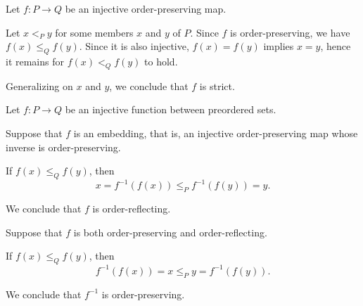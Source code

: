 \begin{defproof}
   Let \( f: P \to Q \) be an injective order-preserving map.

  Let \( x <_P y \) for some members \( x \) and \( y \) of \( P \). Since \( f \) is order-preserving, we have \( f(x) \leq_Q f(y) \). Since it is also injective, \( f(x) = f(y) \) implies \( x = y \), hence it remains for \( f(x) <_Q f(y) \) to hold.

  Generalizing on \( x \) and \( y \), we conclude that \( f \) is strict.

   Let \( f: P \to Q \) be an injective function between preordered sets.

  \SufficiencySubProof* Suppose that \( f \) is an embedding, that is, an injective order-preserving map whose inverse is order-preserving.

  If \( f(x) \leq_Q f(y) \), then
  \begin{equation*}
    x = f^{-1}(f(x)) \leq_P f^{-1}(f(y)) = y.
  \end{equation*}

  We conclude that \( f \) is order-reflecting.

  \NecessitySubProof* Suppose that \( f \) is both order-preserving and order-reflecting.

  If \( f(x) \leq_Q f(y) \), then
  \begin{equation*}
    f^{-1}(f(x)) = x \leq_P y = f^{-1}(f(y)).
  \end{equation*}

  We conclude that \( f^{-1} \) is order-preserving.
\end{defproof}
